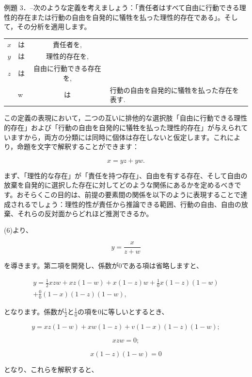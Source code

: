 \documentclass[a4paper,11pt,openany]{ltjsbook}
\begin{document}
例題 3．--次のような定義を考えましょう：「責任者はすべて自由に行動できる理性的存在または行動の自由を自発的に犠牲を払った理性的存在である」。そして，その分析を適用します。

\begin{tabular}{c l c l}
$x$ &は&責任者を, \\
$y$ &は&理性的存在を, \\
$z$ &は&自由に行動できる存在を, \\
&w &は&行動の自由を自発的に犠牲を払った存在を表す.
\end{tabular}

この定義の表現において，二つの互いに排他的な選択肢「自由に行動できる理性的存在」および「行動の自由を自発的に犠牲を払った理性的存在」が与えられていますから，両方の分類には同時に個体は存在しないと仮定します。これにより，命題を文字で解釈することができます：

\[
x = yz + yw.
\]

まず、「理性的な存在」が「責任を持つ存在」、自由を有する存在、そして自由の放棄を自発的に選択した存在に対してどのような関係にあるかを定めるべきです。おそらくこの目的は、前提の要素間の関係を以下のように表現することで達成されるでしょう：理性的性が責任から推論できる範囲、行動の自由、自由の放棄、それらの反対面からどれほど推測できるか。

(6)より、

\[
y = \frac{x}{z + w}
\]

を導きます。第二項を開発し、係数が0である項は省略しますと、

\begin{eqnarray*}
y = \frac{1}{2}xzw + xz(1-w) + x(1-z)w + \frac{1}{0}x(1-z)(1-w)\\
                                       + \frac{0}{0}(1-x)(1-z)(1-w),
\end{eqnarray*}

となります。係数が$\frac{1}{2}$と$\frac{1}{0}$の項を0に等しいとするとき、

\begin{equation}
y = xz(1-w) + xw(1-z) + v(1-x)(1-z)(1-w);
\end{equation}

\begin{equation}
xzw = 0;
\end{equation}

\begin{equation}
x(1-z)(1-w)= 0
\end{equation}

となり、これらを解釈すると、
\end{document}
